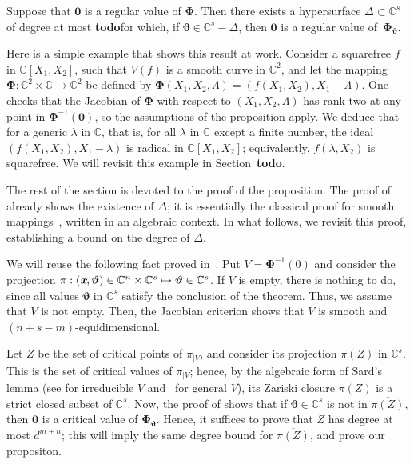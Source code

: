 \documentclass[sigconf]{acmart}
\def\td{{\bf todo}}
\def\thetab{\bm{\vartheta}}
\def\xb{\textit{\textbf{x}}}
\def\C{\mathbb{C}}
\def\dt{s}
\begin{document}
\begin{proposition} \label{prop:weak_t}
  Suppose that $\bm 0$ is a regular value of $\bm\Phi$. Then there
  exists a hypersurface $\Delta \subset \C^{\dt}$ of degree at most
  \td for which, if $\thetab \in \C^{\dt}-\Delta$, then $\bm 0$ is a
  regular value of~$\bm\Phi_{\thetab}$.
\end{proposition}

Here is a simple example that shows this result at work. Consider a
squarefree $f$ in $\C[X_1,X_2]$, such that $V(f)$ is a smooth curve in
$\C^2$, and let the mapping $\bm\Phi:\C^2\times \C \to \C^2$ be defined
by $\bm\Phi(X_1,X_2,\Lambda) = (f(X_1,X_2), X_1-\Lambda)$. One checks
that the Jacobian of $\bm\Phi$ with respect to $(X_1,X_2,\Lambda)$ has
rank two at any point in $\bm\Phi^{-1}(\bm 0)$, so the assumptions of the
proposition apply. We deduce that for a generic $\lambda$ in $\C$,
that is, for all $\lambda$ in $\C$ except a finite number, the ideal
$(f(X_1,X_2), X_1-\lambda)$ is radical in $\C[X_1,X_2]$; equivalently,
$f(\lambda, X_2)$ is squarefree. We will revisit this example in
Section~\td.

The rest of the section is devoted to the proof of the proposition.
The proof of \cite[Theorem B.3]{TWT} already shows the existence of
$\Delta$; it is essentially the classical proof for smooth
mappings~\cite[Section~3.7]{demazure2000bifurcations}, written in an
algebraic context. In what follows, we revisit this proof,
establishing a bound on the degree of $\Delta$.

We will reuse the following fact proved in~\cite{TWT}.  Put $V =
\bm\Phi^{-1}(0)$ and consider the projection $\pi:(\xb, \thetab) \in
\C^n \times \C^{\dt} \mapsto \thetab \in\C^{\dt}$.  If $V$ is empty,
there is nothing to do, since all values $\thetab$ in $\C^\dt$ satisfy
the conclusion of the theorem. Thus, we assume that $V$ is not
empty. Then, the Jacobian criterion shows that $V$ is
smooth and $(n+ \dt -m)$-equidimensional.

Let $Z$ be the set of critical points of $\pi_{|V}$, and consider its
projection $\pi(Z)$ in $\C^s$. This is the set of critical values of
$\pi_{|V}$; hence, by the algebraic form of Sard's lemma (see
\cite[Theorem~3.7]{Mumford76} for irreducible $V$
and~\cite[Proposition~B.2]{TWT} for general $V$), its Zariski closure
$\overline{\pi(Z)}$ is a strict closed subset of $\C^s$. Now, the
proof of \cite[Theorem B.3]{TWT} shows that if $\thetab \in \C^{\dt}$
is not in $\overline{\pi(Z)}$, then $\bm 0$ is a critical value of
$\bm\Phi_{\thetab}$. Hence, it suffices to prove that $Z$ has degree
at most $d^{m+n}$; this will imply the same degree bound for
$\overline{\pi(Z)}$, and prove our propositon.
\end{document}
